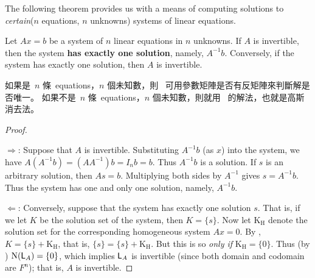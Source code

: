 The following theorem provides us with a means of computing solutions to \emph{certain}(\(n\) equations, \(n\) unknowns) systems of linear equations.

\begin{theorem} \label{thm 3.10}
Let \(Ax = b\) be a system of \(n\) linear equations in \(n\) unknowns.
If \(A\) is invertible, then the system \textbf{has exactly one solution}, namely, \(A^{-1} b\).
Conversely, if the system has exactly one solution, then \(A\) is invertible.
\end{theorem}

\begin{note}
如果是\ \(n\) 條\ equations，\(n\) 個未知數，則\  可用參數矩陣是否有反矩陣來判斷解是否唯一。
如果不是\ \(n\) 條\ equations，\(n\) 個未知數，則就用\  的解法，也就是高斯消去法。
\end{note}

\begin{proof} \

\(\Longrightarrow\):
Suppose that \(A\) is invertible.
Substituting \(A^{-1}b\) (as \(x\)) into the system, we have \(A(A^{-1}b) = (AA^{-1})b = I_n b = b\).
Thus \(A^{-1}b\) is a solution.
If \(s\) is an arbitrary solution, then \(As = b\).
Multiplying both sides by \(A^{-1}\) gives \(s = A^{-1}b\).
Thus the system has one and only one solution, namely, \(A^{-1}b\).

\(\Longleftarrow\):
Conversely, suppose that the system has exactly one solution \(s\).
That is, if we let \(K\) be the solution set of the system, then \(K = \{ s \}\).
Now let \(\mathrm{K_H}\) denote the solution set for the corresponding homogeneous system \(Ax = 0\).
By , \(K = \{ s \} + \mathrm{K_H}\), that is, \(\{ s \} = \{ s \} + \mathrm{K_H}\).
But this is so \emph{only if} \(\mathrm{K_H} = \{ 0 \}\).
Thus (by ) \(\mathrm{N}(\textsf{L}_A) = \{ 0 \}\), which implies \(\textsf{L}_A\) is invertible (since both domain and codomain are \(F^n\));
that is, \(A\) is invertible.
\end{proof}


